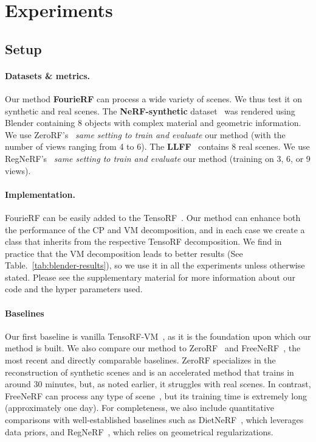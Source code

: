 
\section{Experiments}

\subsection{Setup}
\paragraph{Datasets \& metrics.}

Our method \textbf{FourieRF} can process a wide variety of scenes. We thus test it on synthetic and real scenes. The \textbf{NeRF-synthetic} dataset~\cite{mildenhall2020nerf} was rendered using Blender containing 8 objects with complex material and geometric information. We use ZeroRF's~\cite{shi2024zerorf} \textit{same setting to train and evaluate} our method (with the number of views ranging from 4 to 6). The \textbf{LLFF}~\cite{mildenhall2019local} contains 8 real scenes. We use RegNeRF's~\cite{niemeyer2022regnerf} \textit{same setting to train and evaluate} our method (training on 3, 6, or 9 views).

\vspace{-1em}\paragraph{Implementation.}

FourieRF can be easily added to the TensoRF~\cite{Chen2022ECCV}. Our method can enhance both the performance of the CP and VM decomposition, and in each case we create a class that inherits from the respective TensoRF decomposition. We find in practice that the VM decomposition leads to better results (See Table.~\ref{tab:blender-results}), so we use it in all the experiments unless otherwise stated. Please see the supplementary material for more information about our code and the hyper parameters used.

\vspace{-1em}\paragraph{Baselines}
Our first baseline is vanilla TensoRF-VM~\cite{Chen2022ECCV}, as it is the foundation upon which our method is built. We also compare our method to ZeroRF~\cite{shi2024zerorf} and FreeNeRF~\cite{yang2023freenerf}, the most recent and directly comparable baselines. ZeroRF specializes in the reconstruction of synthetic scenes and is an accelerated method that trains in around 30 minutes, but, as noted earlier, it struggles with real scenes. In contrast, FreeNeRF can process any type of scene~\cite{yang2023freenerf}, but its training time is extremely long (approximately one day). For completeness, we also include quantitative comparisons with well-established baselines such as DietNeRF~\cite{jain2021putting}, which leverages data priors, and RegNeRF~\cite{niemeyer2022regnerf}, which relies on geometrical regularizations.

